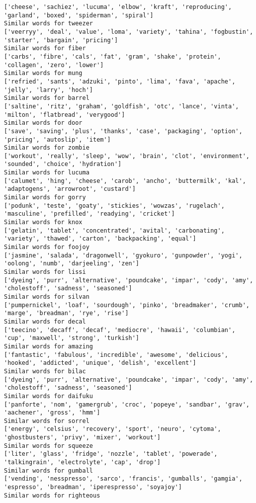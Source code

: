 \documentclass[11pt]{article}
\begin{document}
\begin{Verbatim}[commandchars=\\\{\}]
['cheese', 'sachiez', 'lucuma', 'elbow', 'kraft', 'reproducing', 'garland', 'boxed', 'spiderman', 'spiral']
Similar words for tweezer
['veerryy', 'deal', 'value', 'loma', 'variety', 'tahina', 'fogbustin', 'starter', 'bargain', 'pricing']
Similar words for fiber
['carbs', 'fibre', 'cals', 'fat', 'gram', 'shake', 'protein', 'collagen', 'zero', 'lower']
Similar words for mung
['refried', 'sants', 'adzuki', 'pinto', 'lima', 'fava', 'apache', 'jelly', 'larry', 'hoch']
Similar words for barrel
['saltine', 'ritz', 'graham', 'goldfish', 'otc', 'lance', 'vinta', 'milton', 'flatbread', 'verygood']
Similar words for door
['save', 'saving', 'plus', 'thanks', 'case', 'packaging', 'option', 'pricing', 'autoslip', 'item']
Similar words for zombie
['workout', 'really', 'sleep', 'wow', 'brain', 'clot', 'environment', 'sounded', 'choice', 'hydration']
Similar words for lucuma
['calumet', 'hing', 'cheese', 'carob', 'ancho', 'buttermilk', 'kal', 'adaptogens', 'arrowroot', 'custard']
Similar words for gorry
['podunk', 'teste', 'goaty', 'stickies', 'wowzas', 'rugelach', 'masculine', 'prefilled', 'readying', 'cricket']
Similar words for knox
['gelatin', 'tablet', 'concentrated', 'avital', 'carbonating', 'variety', 'thawed', 'carton', 'backpacking', 'equal']
Similar words for foojoy
['jasmine', 'salada', 'dragonwell', 'gyokuro', 'gunpowder', 'yogi', 'oolong', 'numb', 'darjeeling', 'zen']
Similar words for lissi
['dyeing', 'purr', 'alternative', 'poundcake', 'impar', 'cody', 'amy', 'cholestoff', 'sadness', 'seasoned']
Similar words for silvan
['pumpernickel', 'loaf', 'sourdough', 'pinko', 'breadmaker', 'crumb', 'marge', 'breadman', 'rye', 'rise']
Similar words for decal
['teecino', 'decaff', 'decaf', 'mediocre', 'hawaii', 'columbian', 'cup', 'maxwell', 'strong', 'turkish']
Similar words for amazing
['fantastic', 'fabulous', 'incredible', 'awesome', 'delicious', 'hooked', 'addicted', 'unique', 'delish', 'excellent']
Similar words for bilac
['dyeing', 'purr', 'alternative', 'poundcake', 'impar', 'cody', 'amy', 'cholestoff', 'sadness', 'seasoned']
Similar words for daifuku
['panforte', 'nom', 'gamergrub', 'croc', 'popeye', 'sandbar', 'grav', 'aachener', 'gross', 'hmm']
Similar words for sorrel
['energy', 'celsius', 'recovery', 'sport', 'neuro', 'cytoma', 'ghostbusters', 'privy', 'mixer', 'workout']
Similar words for squeeze
['liter', 'glass', 'fridge', 'nozzle', 'tablet', 'powerade', 'talkingrain', 'electrolyte', 'cap', 'drop']
Similar words for gumball
['vending', 'nesspresso', 'sarco', 'francis', 'gumballs', 'gamgia', 'espresso', 'breadman', 'iperespresso', 'soyajoy']
Similar words for righteous

\end{Verbatim}
\end{document}

